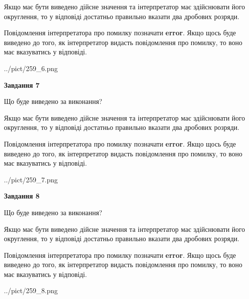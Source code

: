 \documentclass[12pt, ukrainian]{article}
\begin{document}
{\begin {Large}
Якщо має бути виведено дійсне значення та інтерпретатор має здійснювати його округлення, 
то у відповіді достатньо правильно вказати два дробових розряди.

Повідомлення інтерпретатора про помилку позначати \textbf{error}.
Якщо щось буде виведено до того, як інтерпретатор видасть повідомлення про помилку, 
то воно має вказуватись у відповіді. \par

\begin{center}
	{../pict/259_6.png}
\end{center}
\newpage

{\begin {center}\textbf{Завдання 7}\end {center}}\par
Що буде виведено за виконання? \par

Якщо має бути виведено дійсне значення та інтерпретатор має здійснювати його округлення, 
то у відповіді достатньо правильно вказати два дробових розряди.

Повідомлення інтерпретатора про помилку позначати \textbf{error}.
Якщо щось буде виведено до того, як інтерпретатор видасть повідомлення про помилку, 
то воно має вказуватись у відповіді. \par

\begin{center}
	{../pict/259_7.png}
\end{center}
\newpage

{\begin {center}\textbf{Завдання 8}\end {center}}\par
Що буде виведено за виконання? \par

Якщо має бути виведено дійсне значення та інтерпретатор має здійснювати його округлення, 
то у відповіді достатньо правильно вказати два дробових розряди.

Повідомлення інтерпретатора про помилку позначати \textbf{error}.
Якщо щось буде виведено до того, як інтерпретатор видасть повідомлення про помилку, 
то воно має вказуватись у відповіді. \par

\begin{center}
	{../pict/259_8.png}
\end{center}
\newpage


\end{Large}}
\end{document}
